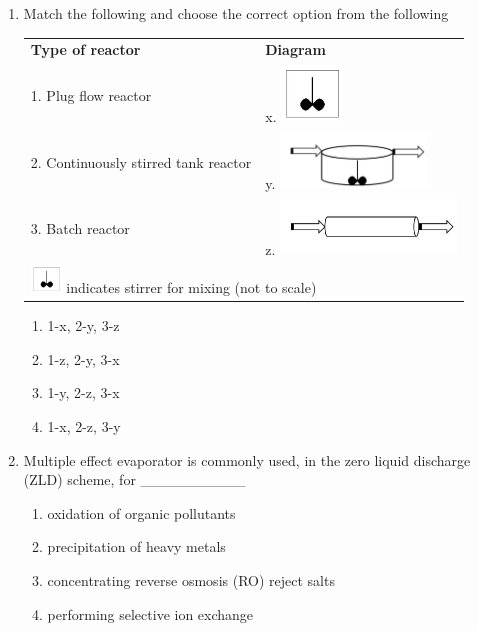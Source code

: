 \documentclass[journal]{IEEEtran}
\begin{document}
\begin{enumerate}[resume]
\item Match the following and choose the correct option from the following
\hfill{}
\begin{table}[H]
\centering
\begin{tabular}{ll}
\textbf{Type of reactor} & \textbf{Diagram} \\
1. Plug flow reactor & x. \includegraphics[height=1.5cm]{figs/fig4.jpg} \\
2. Continuously stirred tank reactor & y. \includegraphics[height=1.5cm]{figs/fig5.jpg} \\
3. Batch reactor & z. \includegraphics[height=1.5cm]{figs/fig6.jpg} \\
\multicolumn{2}{l}{\includegraphics[height=0.75cm]{figs/fig4.jpg} indicates stirrer for mixing (not to scale)}
\end{tabular}
\end{table}
\begin{enumerate}
\item 1-x, 2-y, 3-z
\item 1-z, 2-y, 3-x
\item 1-y, 2-z, 3-x
\item 1-x, 2-z, 3-y
\end{enumerate}

\item Multiple effect evaporator is commonly used, in the zero liquid discharge (ZLD) scheme, for \_\_\_\_\_\_\_\_\_\_
\hfill{}
\begin{enumerate}
\item oxidation of organic pollutants
\item precipitation of heavy metals
\item concentrating reverse osmosis (RO) reject salts
\item performing selective ion exchange
\end{enumerate}


\end{enumerate}
\end{document}
